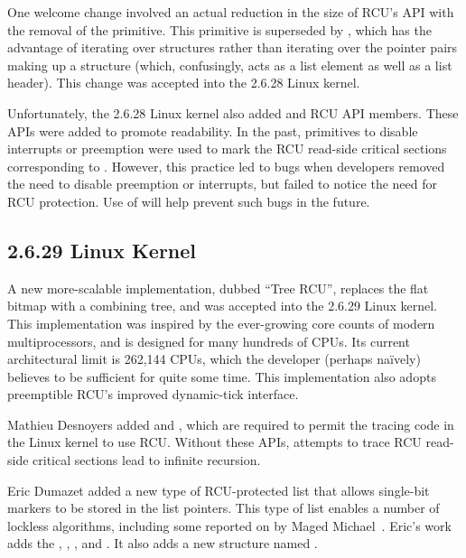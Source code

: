 One welcome change involved an actual reduction in the size of RCU's
API with the removal of the  primitive.
This primitive is superseded by ,
which has the advantage of iterating over structures rather than
iterating over the pointer pairs making up a 
structure (which, confusingly, acts as a list element as well
as a list header).
This change was accepted into the 2.6.28 Linux kernel.

Unfortunately, the 2.6.28 Linux kernel also added
 and
 RCU API members.
These APIs were added to promote readability.
In the past, primitives to disable interrupts or preemption were used
to mark the RCU read-side critical sections corresponding to
.
However, this practice led to bugs when developers removed the need
to disable preemption or interrupts, but failed to notice the need
for RCU protection.
Use of  will help prevent such bugs in the
future.

\subsection{2.6.29 Linux Kernel}

A new more-scalable implementation, dubbed ``Tree RCU'', replaces
the flat bitmap with a combining tree, and was accepted into the 2.6.29
Linux kernel.
This implementation was inspired by the ever-growing core counts of
modern multiprocessors, and is designed for many hundreds of CPUs.
Its current architectural limit is 262,144 CPUs, which the developer
(perhaps na\"ively) believes to be sufficient for quite some time.
This implementation also adopts preemptible RCU's improved dynamic-tick
interface.

Mathieu Desnoyers added
 and
,
which are required to permit the tracing code in the Linux kernel
to use RCU.
Without these APIs, attempts to trace RCU read-side critical sections
lead to infinite recursion.

Eric Dumazet added a new type of RCU-protected list that allows single-bit
markers to be stored in the list pointers.
This type of list enables a number of lockless algorithms, including
some reported on by Maged Michael~\cite{MagedMichael04a}.
Eric's work adds the ,
, , and
.
It also adds a new structure named .


